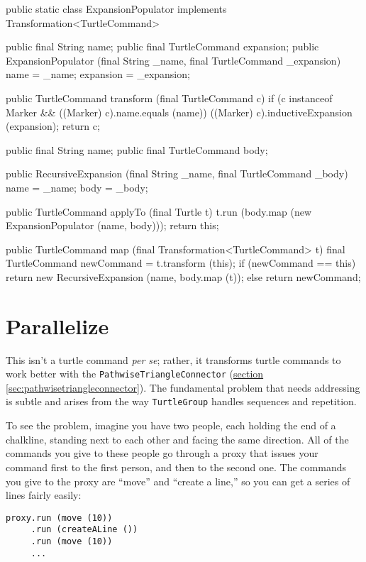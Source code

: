 \documentclass{report}
\newcommand{\Ref}[2]{\hyperref[#2]{#1 \ref*{#2}}}
\begin{document}
\begin{javacode}
{  public static class ExpansionPopulator implements Transformation<TurtleCommand> {
    public final String        name;
    public final TurtleCommand expansion;
    public ExpansionPopulator (final String _name, final TurtleCommand _expansion)
      {name = _name; expansion = _expansion;}

    public TurtleCommand transform (final TurtleCommand c) {
      if (c instanceof Marker && ((Marker) c).name.equals (name)) ((Marker) c).inductiveExpansion (expansion);
      return c;
    }
  }

  public final String        name;
  public final TurtleCommand body;

  public RecursiveExpansion (final String _name, final TurtleCommand _body) {name = _name; body = _body;}

  public TurtleCommand applyTo (final Turtle t) {
    t.run (body.map (new ExpansionPopulator (name, body)));
    return this;
  }

  public TurtleCommand map (final Transformation<TurtleCommand> t) {
    final TurtleCommand newCommand = t.transform (this);
    if (newCommand == this) return new RecursiveExpansion (name, body.map (t));
    else                    return newCommand;
  }
}
\end{javacode}

\section {Parallelize} \label{sec:parallelize}
      This isn't a turtle command {\em per se}; rather, it transforms turtle commands to work better with the {\tt PathwiseTriangleConnector}
      (\Ref{section}{sec:pathwisetriangleconnector}). The fundamental problem that needs addressing is subtle and arises from the way {\tt TurtleGroup} handles
      sequences and repetition.

      To see the problem, imagine you have two people, each holding the end of a chalkline, standing next to each other and facing the same direction. All of
      the commands you give to these people go through a proxy that issues your command first to the first person, and then to the second one. The commands you
      give to the proxy are ``move'' and ``create a line,'' so you can get a series of lines fairly easily:

\begin{verbatim}
proxy.run (move (10))
     .run (createALine ())
     .run (move (10))
     ...
\end{verbatim}
\end{document}
